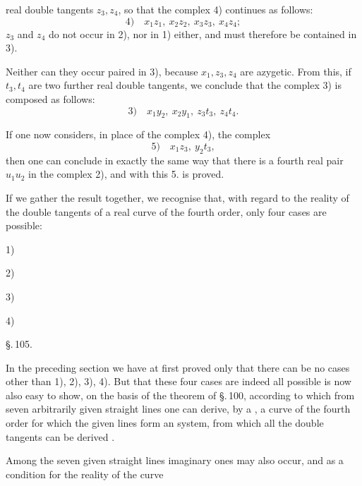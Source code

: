 real double tangents $z_3, z_4$, so that the complex 4) continues
as follows:
\[
4)\quad x_1z_1,\ x_2z_2,\ x_3z_3,\ x_4z_4;
\]
$z_3$ and $z_4$ do not occur in 2), nor in 1) either, and
must therefore be contained in 3).

Neither can they occur paired in 3), because
$x_1, z_3, z_4$ are azygetic. From this, if $t_3, t_4$ are two
further real double tangents, we conclude that the complex 3)
is composed as follows:
\[
3)\quad x_1y_2,\ x_2y_1,\ z_3t_3,\ z_4t_4.
\]

If one now considers, in place of the complex 4), the complex
\[
5)\quad x_1z_3,\ y_2t_3,
\]
then one can conclude in exactly the same way that there is a
fourth real pair $u_1u_2$ in the complex 2), and with this 5. is proved.

If we gather the result together, we recognise that,
with regard to the reality of the double tangents of a real
curve of the fourth order, only four cases are possible:

1) 

2) 

3) 

4) 

\begin{center}
\S.\,105.\\
\end{center}

In the preceding section we have at first proved only
that there can be no cases other than 1), 2), 3), 4).
But that these four cases are indeed all possible is now
also easy to show, on the basis of the theorem of \S.\,100, according
to which from seven arbitrarily given straight lines one can
derive, by a , a curve of the fourth order for
which the given lines form an  system,
from which all the double tangents can be derived .

Among the seven given straight lines imaginary ones may
also occur, and as a condition for the reality of the curve
